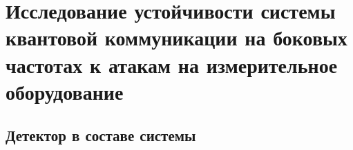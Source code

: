 \chapter{Исследование устойчивости системы квантовой коммуникации на боковых частотах к атакам на измерительное оборудование}  \label{ch:ch2}
\section{Детектор в составе системы} \label{sec:ch2/sec1}





